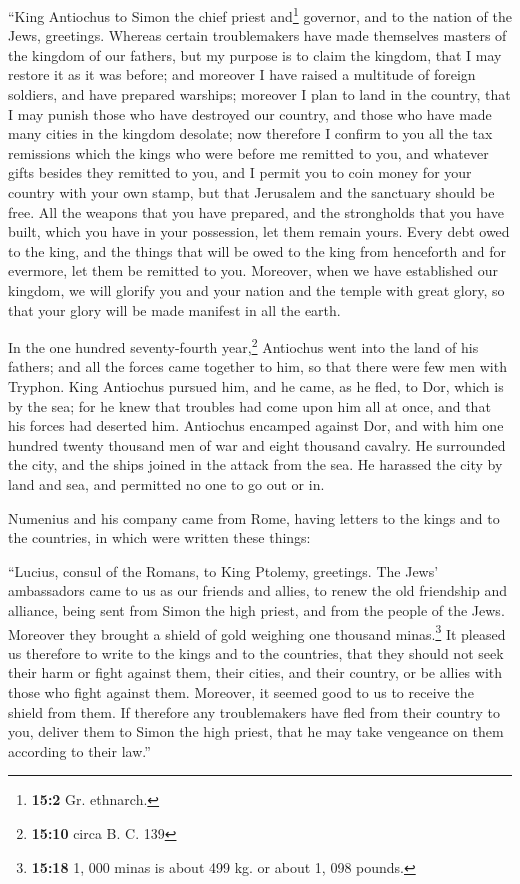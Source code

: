 ``King Antiochus to Simon the chief priest and\footnote{\textbf{15:2}
  Gr. ethnarch.} governor, and to the nation of the Jews, greetings.
 Whereas certain troublemakers have made themselves
masters of the kingdom of our fathers, but my purpose is to claim the
kingdom, that I may restore it as it was before; and moreover I have
raised a multitude of foreign soldiers, and have prepared warships;
 moreover I plan to land in the country, that I may punish
those who have destroyed our country, and those who have made many
cities in the kingdom desolate;  now therefore I confirm
to you all the tax remissions which the kings who were before me
remitted to you, and whatever gifts besides they remitted to you,
 and I permit you to coin money for your country with your
own stamp,  but that Jerusalem and the sanctuary should be
free. All the weapons that you have prepared, and the strongholds that
you have built, which you have in your possession, let them remain
yours.  Every debt owed to the king, and the things that
will be owed to the king from henceforth and for evermore, let them be
remitted to you.  Moreover, when we have established our
kingdom, we will glorify you and your nation and the temple with great
glory, so that your glory will be made manifest in all the earth.

 In the one hundred seventy-fourth year,\footnote{\textbf{15:10}
  circa B. C. 139} Antiochus went into the land of his fathers; and all
the forces came together to him, so that there were few men with
Tryphon.  King Antiochus pursued him, and he came, as he
fled, to Dor, which is by the sea;  for he knew that
troubles had come upon him all at once, and that his forces had deserted
him.  Antiochus encamped against Dor, and with him one
hundred twenty thousand men of war and eight thousand cavalry.
 He surrounded the city, and the ships joined in the
attack from the sea. He harassed the city by land and sea, and permitted
no one to go out or in.

 Numenius and his company came from Rome, having letters
to the kings and to the countries, in which were written these things:

 ``Lucius, consul of the Romans, to King Ptolemy,
greetings.  The Jews' ambassadors came to us as our
friends and allies, to renew the old friendship and alliance, being sent
from Simon the high priest, and from the people of the Jews.
 Moreover they brought a shield of gold weighing one
thousand minas.\footnote{\textbf{15:18} 1, 000 minas is about 499 kg. or
  about 1, 098 pounds.}  It pleased us therefore to write
to the kings and to the countries, that they should not seek their harm
or fight against them, their cities, and their country, or be allies
with those who fight against them.  Moreover, it seemed
good to us to receive the shield from them.  If therefore
any troublemakers have fled from their country to you, deliver them to
Simon the high priest, that he may take vengeance on them according to
their law.''

